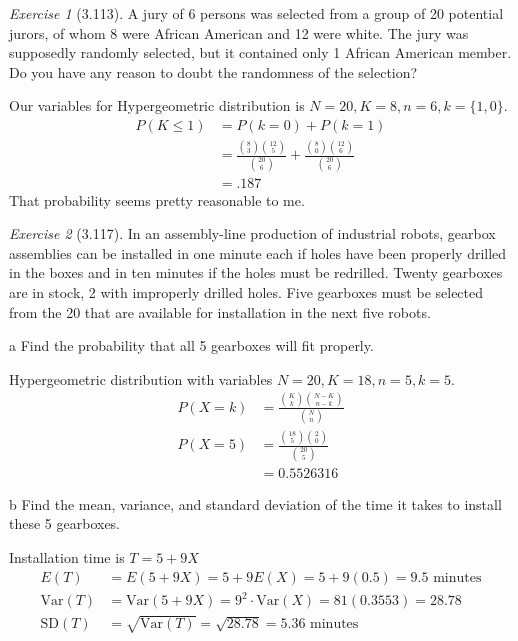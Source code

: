 \documentclass[12pt]{amsart}
\makeatletter
\theoremstyle{remark}
\newtheorem*{exercise}{Exercise}%
\renewenvironment{proof}[1][\proofname]{\par\doublespacing
  \pushQED{\qed}%
  \normalfont \topsep6\p@\@plus6\p@\relax
  \list{}{%
    \settowidth{\leftmargin}{\itshape\proofname:\hskip\labelsep}%
    \setlength{\labelwidth}{0pt}%
    \setlength{\itemindent}{-\leftmargin}%
  }%
  \item[\hskip\labelsep\itshape#1\@addpunct{:}]\ignorespaces
}{%
  \popQED\endlist\@endpefalse
  \singlespacing
}
\theoremstyle{mycomment}
\makeatother
\begin{document}
\begin{exercise}[3.113]A jury of 6 persons was selected from a group of 20 potential jurors, of whom 8 were African
American and 12 were white. The jury was supposedly randomly selected, but it contained
only 1 African American member. Do you have any reason to doubt the randomness of the
selection?
	\begin{proof}[Solution]
		Our variables for Hypergeometric distribution is $N = 20, K = 8, n = 6, k = \{1,0\}$.
		\begin{align*}
			P(K \leq 1) &= P(k = 0) + P(k = 1) \\
			&= \frac{{8 \choose 3}{12 \choose 5}}{{20 \choose 6}} + \frac{{8 \choose 0}{12 \choose 6}}{{20 \choose 6}} \\
			&= .187
		\end{align*}
	\end{proof}
	That probability seems pretty reasonable to me.
\end{exercise}

\begin{exercise}[3.117] In an assembly-line production of industrial robots, gearbox assemblies can be installed in
one minute each if holes have been properly drilled in the boxes and in ten minutes if
the holes must be redrilled. Twenty gearboxes are in stock, 2 with improperly drilled holes.
Five gearboxes must be selected from the 20 that are available for installation in the next five
robots.

	a
Find the probability that all 5 gearboxes will fit properly.
	\begin{proof}[Solution]
		Hypergeometric distribution with variables $N =20, K =18 ,n = 5,k = 5$.
		\begin{align*}
			P(X=k) &= \frac{{K \choose k}{N - K \choose n - k}}{{N \choose n}} \\
			P(X=5) &= \frac{{18 \choose 5}{2 \choose 0}}{{20 \choose 5}} \\
				&= 0.5526316
		\end{align*}
	\end{proof}

	b
Find the mean, variance, and standard deviation of the time it takes to install these
5 gearboxes.
	\begin{proof}[Solution]
		Installation time is $T = 5 + 9X$
		\begin{align*}
			E(T) &= E(5 + 9X) = 5 + 9E(X) = 5 + 9(0.5) = 9.5 \text{ minutes} \\
			\text{Var}(T) &= \text{Var}(5 + 9X) = 9^2 \cdot \text{Var}(X) = 81(0.3553) = 28.78 \\
			\text{SD}(T) &= \sqrt{\text{Var}(T)} = \sqrt{28.78} = 5.36 \text{ minutes}
		\end{align*}
	\end{proof}
\end{exercise}
\end{document}
